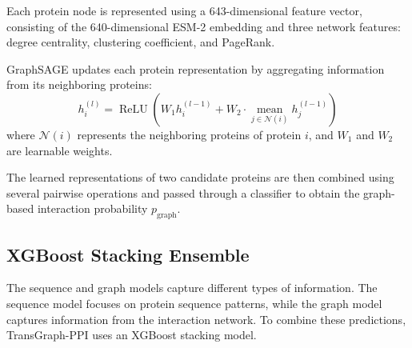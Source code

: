 \documentclass[conference]{IEEEtran}
\newcommand{\pgraph}{p_{\mathrm{graph}}}
\begin{document}
Each protein node is represented using a 643-dimensional feature vector,
consisting of the 640-dimensional ESM-2 embedding and three network features:
degree centrality, clustering coefficient, and PageRank.

GraphSAGE updates each protein representation by aggregating information from
its neighboring proteins:
\begin{equation}
h_i^{(l)} =
\operatorname{ReLU}\!\left(
W_1 h_i^{(l-1)}
+
W_2 \cdot
\operatorname*{mean}_{j \in \mathcal{N}(i)} h_j^{(l-1)}
\right)
\label{eq:sage}
\end{equation}
where $\mathcal{N}(i)$ represents the neighboring proteins of protein $i$, and
$W_1$ and $W_2$ are learnable weights.

The learned representations of two candidate proteins are then combined using
several pairwise operations and passed through a classifier to obtain the
graph-based interaction probability $\pgraph$.

\subsection{XGBoost Stacking Ensemble}\label{sec:stack}
The sequence and graph models capture different types of information. The
sequence model focuses on protein sequence patterns, while the graph model
captures information from the interaction network. To combine these
predictions, TransGraph-PPI uses an XGBoost stacking model.
\end{document}
